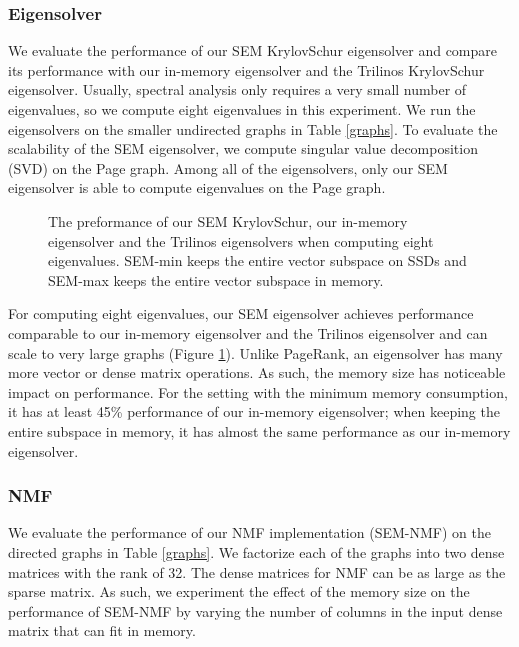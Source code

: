 \subsubsection{Eigensolver}

We evaluate the performance of our SEM KrylovSchur eigensolver and compare
its performance
with our in-memory eigensolver and the Trilinos KrylovSchur eigensolver.
Usually, spectral analysis \cite{} only requires a very small number of
eigenvalues, so we compute eight eigenvalues in this experiment. We run
the eigensolvers on the smaller undirected graphs
in Table \ref{graphs}. To evaluate the scalability of the SEM eigensolver,
we compute singular value decomposition (SVD) on the Page graph. Among all of
the eigensolvers, only our SEM eigensolver is able to compute eigenvalues
on the Page graph.

\begin{figure}
	\begin{center}
		\footnotesize
		
		\caption{The preformance of our SEM KrylovSchur, our in-memory eigensolver
			and the Trilinos eigensolvers when computing eight
			eigenvalues. SEM-min keeps the entire vector subspace on SSDs and
		SEM-max keeps the entire vector subspace in memory.}
		\label{fig:eigen}
	\end{center}
\end{figure}

For computing eight eigenvalues, our SEM eigensolver achieves performance
comparable to our in-memory eigensolver and the Trilinos eigensolver
and can scale to very large graphs (Figure \ref{fig:eigen}).
Unlike PageRank, an eigensolver has many more vector or dense matrix operations.
As such, the memory size has noticeable impact on performance.
For the setting with the minimum memory consumption, it has at least 45\%
performance of our in-memory eigensolver; when keeping the entire subspace
in memory, it has almost the same performance as our in-memory eigensolver.

\subsubsection{NMF}
We evaluate the performance of our NMF implementation (SEM-NMF) on the directed
graphs in Table \ref{graphs}. We factorize each of the graphs into two dense
matrices with the rank of 32. The dense matrices for NMF can be as large as
the sparse matrix. As such, we experiment the effect of the memory size on
the performance of SEM-NMF by varying the number of columns
in the input dense matrix that can fit in memory.

